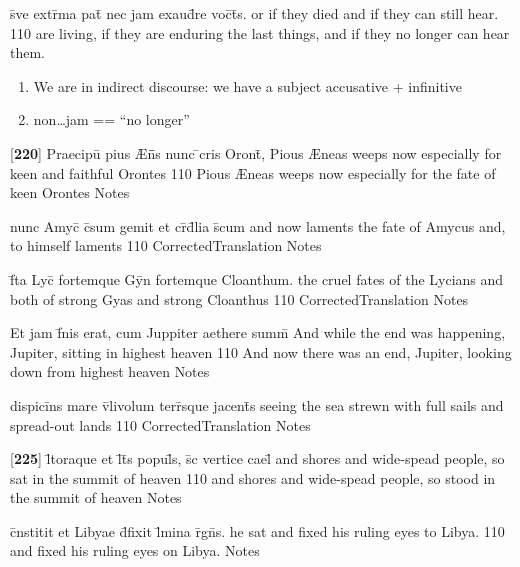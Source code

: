 \documentclass[]{book}
\begin{document}
\latline
  {s\={\macron {\i}}ve extr\={}ma pat\={\macron {\i}} nec jam exaud\={\macron {\i}}re voc\={}t\={}s.}
  { or if they died and if they can still hear. }
  {110}
  { are living, if they are enduring the last things, and if they no longer can hear them. }
  { \begin{enumerate}
  	\item We are in indirect discourse:  we have a subject accusative + infinitive
  	\item non{\ldots}jam == ``no longer''
  \end{enumerate} }

\latline
  {[\textbf{220}] Praecipu\={} pius {\AE}n\={}\={}s nunc \={}cris Oront\={\macron {\i}},}
  { Pious {\AE}neas weeps now especially for keen and faithful Orontes }
  {110}
  { Pious {\AE}neas weeps now especially for the fate of keen Orontes }
  { Notes }


\latline
  {nunc Amyc\={\macron {\i}} c\={}sum gemit et cr\={}d\={}lia s\={}cum}
  { and now laments the fate of Amycus and, to himself laments }
  {110}
  { CorrectedTranslation }
  { Notes }


\latline
  {f\={}ta Lyc\={\macron {\i}} fortemque Gy\={}n fortemque Cloanthum.}
  { the cruel fates of the Lycians and both of strong Gyas and strong Cloanthus }
  {110}
  { CorrectedTranslation }
  { Notes }


\latline
  {Et jam f\={\macron {\i}}nis erat, cum Juppiter aethere summ\={}}
  { And while the end was happening, Jupiter, sitting in highest heaven }
  {110}
  { And now there was an end, Jupiter, looking down from highest heaven }
  { Notes }


\latline
  {dispici\={}ns mare v\={}livolum terr\={}sque jacent\={\macron {\i}}s}
  { seeing the sea strewn with full sails and spread-out lands }
  {110}
  { CorrectedTranslation }
  { Notes }


\latline
  {[\textbf{225}] l\={\macron {\i}}toraque et l\={}t\={}s popul\={}s, s\={\macron {\i}}c vertice cael\={\macron {\i}}}
  { and shores and wide-spead people, so sat in the summit of heaven }
  {110}
  { and shores and wide-spead people, so stood in the summit of heaven }
  { Notes }


\latline
  {c\={}nstitit et Libyae d\={}fixit l\={}mina r\={}gn\={\macron {\i}}s.}
  { he sat and fixed his ruling eyes to Libya. }
  {110}
  { and fixed his ruling eyes on Libya. }
  { Notes }
\end{document}
